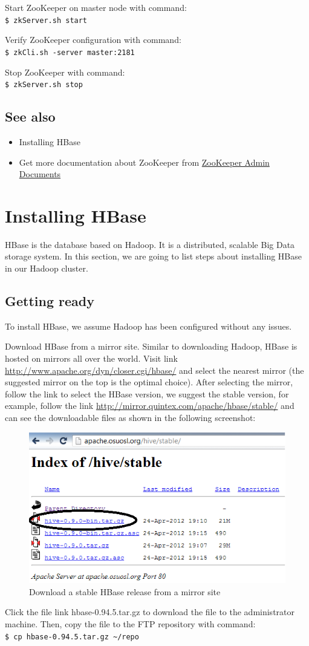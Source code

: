 Start ZooKeeper on master node with command: \\
\verb|$ zkServer.sh start|

Verify ZooKeeper configuration with command: \\
\verb|$ zkCli.sh -server master:2181|

Stop ZooKeeper with command: \\
\verb|$ zkServer.sh stop|

\subsection*{See also}
\begin{itemize}
  \item Installing HBase
  \item Get more documentation about ZooKeeper from \href{http://zookeeper.apache.org/doc/r3.4.5/zookeeperAdmin.html}{ZooKeeper Admin Documents}
\end{itemize}

\section{Installing HBase}
HBase is the database based on Hadoop. It is a distributed, scalable Big Data storage system. In this section, we are going to list steps about installing HBase in our Hadoop cluster.

\subsection*{Getting ready}
To install HBase, we assume Hadoop has been configured without any issues.

Download HBase from a mirror site. Similar to downloading Hadoop, HBase is hosted on mirrors all over the world. Visit link \url{http://www.apache.org/dyn/closer.cgi/hbase/} and select the nearest mirror (the suggested mirror on the top is the optimal choice).  After selecting the mirror, follow the link to select the HBase version, we suggest the stable version, for example, follow the link \url{http://mirror.quintex.com/apache/hbase/stable/} and can see the downloadable files as shown in the following screenshot:
\begin{figure}[ht]
  \centering
  \includegraphics[width=.6\textwidth]{figs/5163os_03_08.png}
  \caption{Download a stable HBase release from a mirror site}\label{fig:hbase.download}
\end{figure} 
Click the file link hbase-0.94.5.tar.gz to download the file to the administrator machine. Then, copy the file to the FTP repository with command: \\
\verb|$ cp hbase-0.94.5.tar.gz ~/repo|

